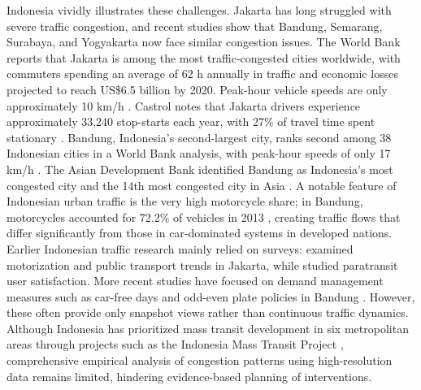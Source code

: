\documentclass[review,authoryear]{elsarticle}
\begin{document}
Indonesia vividly illustrates these challenges. Jakarta has long struggled with severe traffic congestion, and recent studies show that Bandung, Semarang, Surabaya, and Yogyakarta now face similar congestion issues. The World Bank reports that Jakarta is among the most traffic-congested cities worldwide, with commuters spending an average of 62 h annually in traffic and economic losses projected to reach US\$6.5 billion by 2020. Peak-hour vehicle speeds are only approximately 10 km/h \citep{WorldBank2021}. Castrol notes that Jakarta drivers experience approximately 33,240 stop-starts each year, with 27\% of travel time spent stationary \citep{Castrol2015}. Bandung, Indonesia's second-largest city, ranks second among 38 Indonesian cities in a World Bank analysis, with peak-hour speeds of only 17 km/h \citep{WorldBank2019}. The Asian Development Bank identified Bandung as Indonesia's most congested city and the 14th most congested city in Asia \citep{ADB2019}. A notable feature of Indonesian urban traffic is the very high motorcycle share; in Bandung, motorcycles accounted for 72.2\% of vehicles in 2013 \citep{BPSBandung2015}, creating traffic flows that differ significantly from those in car-dominated systems in developed nations. Earlier Indonesian traffic research mainly relied on surveys: \citet{Susilo2007} examined motorization and public transport trends in Jakarta, while \citet{Joewono2008} studied paratransit user satisfaction. More recent studies have focused on demand management measures such as car-free days and odd-even plate policies in Bandung \citep{Farda2020}. However, these often provide only snapshot views rather than continuous traffic dynamics. Although Indonesia has prioritized mass transit development in six metropolitan areas through projects such as the Indonesia Mass Transit Project \citep{WorldBank2022}, comprehensive empirical analysis of congestion patterns using high-resolution data remains limited, hindering evidence-based planning of interventions.
\end{document}
